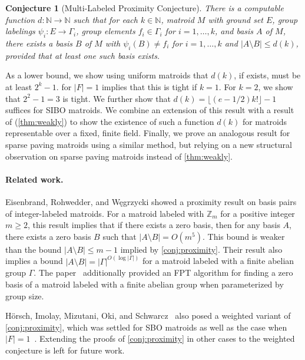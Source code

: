 \documentclass{article}
\newtheorem{conjecture}[theorem]{Conjecture}
\theoremstyle{definition}
\newcommand{\N}{\mathbb{N}}
\begin{document}
\begin{conjecture}[{Multi-Labeled Proximity Conjecture}] \label{conj:multiple} 
There is a computable function $d\colon \N \to \N$ such that for each $k \in \N$, matroid $M$ with ground set $E$, group labelings $\psi_i \colon E \to \Gamma_i$, group elements  $f_i \in \Gamma_i$ for $i = 1, \dotsc, k$, and basis $A$ of $M$, there exists a basis $B$ of $M$ with $\psi_i(B) \ne f_i$ for $i = 1, \dotsc, k$ and $|A\setminus B| \le d(k)$, provided that at least one such basis exists.
\end{conjecture}

As a lower bound, we show using uniform matroids 
that $d(k)$, if exists, must be at least $2^k - 1$.
 for $|F| = 1$ implies that this is tight if $k=1$.
For $k = 2$, we show that $2^2 - 1 = 3$ is tight.
We further show that $d(k) = \lfloor (e-1/2)k! \rfloor - 1$ suffices for SIBO matroids.
We combine an extension of this result with a result of \cite{horsch2024problems} (\cref{thm:weakly}) to show the existence of such a function $d(k)$ 
for matroids representable over a fixed, finite field.
Finally, we prove an analogous result for sparse paving matroids using a similar method, but relying on a new structural observation on sparse paving matroids instead of \cref{thm:weakly}.

\paragraph{Related work.}
Eisenbrand, Rohwedder, and W\k{e}grzycki \cite{eisenbrand2024sensitivity} showed a proximity result on basis pairs of integer-labeled matroids.
For a matroid labeled with $\mathbb{Z}_m$ for a positive integer $m\ge 2$, this result implies that if there exists a zero basis,
then for any basis $A$, there exists a zero basis $B$ such that $|A\setminus B| = O(m^5)$.
This bound is weaker than the bound $|A\setminus  B|\le m-1$ implied by \cref{conj:proximity}.
Their result also implies a bound $|A\setminus B| = |\Gamma|^{O(\log |\Gamma|)}$ for a matroid labeled with a finite abelian group $\Gamma$.
The paper~\cite{eisenbrand2024sensitivity} additionally provided an FPT algorithm for finding a zero basis of a matroid labeled with a finite abelian group when parameterized by group size.

Hörsch, Imolay, Mizutani, Oki, and Schwarcz~\cite{horsch2024problems} also posed a weighted variant of \cref{conj:proximity}, which was settled for SBO matroids as well as the case when $|F| = 1$~\cite{horsch2024problems}.
Extending the proofs of \cref{conj:proximity} in other cases to the weighted conjecture is left for future work.
\end{document}
